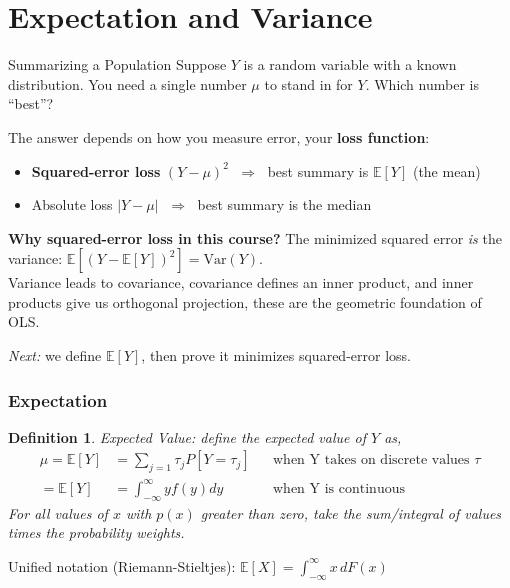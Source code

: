 \documentclass[aspectratio=169, handout, t]{beamer}
\newtheorem{defn}{Definition}
\numberwithin{equation}{section}
\begin{document}
\section[E and Var]{Expectation and Variance}

\begin{frame}{Summarizing a Population}
Suppose $Y$ is a random variable with a known distribution. You need a single number $\mu$ to stand in for $Y$. Which number is ``best''?\pause

\vspace{0.3cm}

The answer depends on how you measure error, your \textbf{loss function}:
\begin{itemize}
\item \textbf{Squared-error loss} $(Y-\mu)^2$ $\;\Rightarrow\;$ best summary is $\mathbb{E}[Y]$ (the mean)\pause
\item Absolute loss $|Y-\mu|$ $\;\Rightarrow\;$ best summary is the median
\end{itemize}\pause

\vspace{0.3cm}

\textbf{Why squared-error loss in this course?} The minimized squared error \emph{is} the variance: $\mathbb{E}[(Y-\mathbb{E}[Y])^2] = \text{Var}(Y)$. \\ 
Variance leads to covariance, covariance defines an inner product, and inner products give us orthogonal projection, these are the geometric foundation of OLS. 
\pause

\vspace{0.3cm}

\emph{Next:} we define $\mathbb{E}[Y]$, then prove it minimizes squared-error loss.
\end{frame}


\begin{frame}
\frametitle{Expectation}

\begin{defn}
Expected Value: define the expected value of $Y$ as,
\begin{align*}
\mu=\mathbb{E}[Y] &=  \sum_{j=1} \tau_j P[Y=\tau_j] &&\text{when Y takes on discrete values $\tau$} \\
=\mathbb{E}[Y] &=  \int_{-\infty}^{\infty} y f(y) dy &&\text{when Y is continuous}
\end{align*}
For all values of $x$ with $p(x)$ greater than zero, take the sum/integral of values times the probability weights.
\end{defn}
Unified notation (Riemann-Stieltjes): $\mathbb{E}[X]=\int_{-\infty}^{\infty} x \, dF(x)$
\end{frame}
\end{document}
